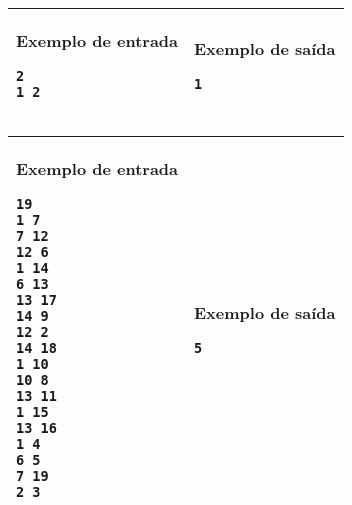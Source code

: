 \begin{table}[!h]
\centering
\begin{tabular}{|l|l|}
\hline
\begin{minipage}[t]{3in}
\textbf{Exemplo de entrada}
\begin{verbatim}
2
1 2
\end{verbatim}
\vspace{1mm}
\end{minipage}
&
\begin{minipage}[t]{3in}
\textbf{Exemplo de saída}
\begin{verbatim}
1
\end{verbatim}
\vspace{1mm}
\end{minipage} \\
\hline
\end{tabular}
\end{table}

\newpage
\begin{table}[!h]
\centering
\begin{tabular}{|l|l|}
\hline
\begin{minipage}[t]{3in}
\textbf{Exemplo de entrada}
\begin{verbatim}
19
1 7
7 12
12 6
1 14
6 13
13 17
14 9
12 2
14 18
1 10
10 8
13 11
1 15
13 16
1 4
6 5
7 19
2 3
\end{verbatim}
\vspace{1mm}
\end{minipage}
&
\begin{minipage}[t]{3in}
\textbf{Exemplo de saída}
\begin{verbatim}
5
\end{verbatim}
\vspace{1mm}
\end{minipage} \\
\hline
\end{tabular}
\end{table}
